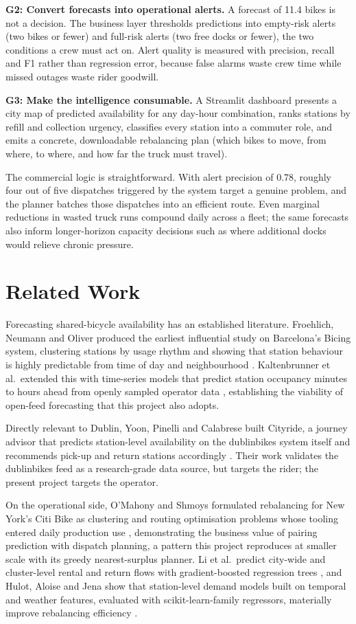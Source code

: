 \documentclass[conference]{IEEEtran}
\begin{document}
\textbf{G2: Convert forecasts into operational alerts.} A forecast of 11.4 bikes is not a decision. The business layer thresholds predictions into empty-risk alerts (two bikes or fewer) and full-risk alerts (two free docks or fewer), the two conditions a crew must act on. Alert quality is measured with precision, recall and F1 rather than regression error, because false alarms waste crew time while missed outages waste rider goodwill.

\textbf{G3: Make the intelligence consumable.} A Streamlit dashboard presents a city map of predicted availability for any day-hour combination, ranks stations by refill and collection urgency, classifies every station into a commuter role, and emits a concrete, downloadable rebalancing plan (which bikes to move, from where, to where, and how far the truck must travel).

The commercial logic is straightforward. With alert precision of 0.78, roughly four out of five dispatches triggered by the system target a genuine problem, and the planner batches those dispatches into an efficient route. Even marginal reductions in wasted truck runs compound daily across a fleet; the same forecasts also inform longer-horizon capacity decisions such as where additional docks would relieve chronic pressure.

\section{Related Work}
Forecasting shared-bicycle availability has an established literature. Froehlich, Neumann and Oliver produced the earliest influential study on Barcelona's Bicing system, clustering stations by usage rhythm and showing that station behaviour is highly predictable from time of day and neighbourhood \cite{b1}. Kaltenbrunner et al.\ extended this with time-series models that predict station occupancy minutes to hours ahead from openly sampled operator data \cite{b2}, establishing the viability of open-feed forecasting that this project also adopts.

Directly relevant to Dublin, Yoon, Pinelli and Calabrese built Cityride, a journey advisor that predicts station-level availability on the dublinbikes system itself and recommends pick-up and return stations accordingly \cite{b3}. Their work validates the dublinbikes feed as a research-grade data source, but targets the rider; the present project targets the operator.

On the operational side, O'Mahony and Shmoys formulated rebalancing for New York's Citi Bike as clustering and routing optimisation problems whose tooling entered daily production use \cite{b4}, demonstrating the business value of pairing prediction with dispatch planning, a pattern this project reproduces at smaller scale with its greedy nearest-surplus planner. Li et al.\ predict city-wide and cluster-level rental and return flows with gradient-boosted regression trees \cite{b5}, and Hulot, Aloise and Jena show that station-level demand models built on temporal and weather features, evaluated with scikit-learn-family regressors, materially improve rebalancing efficiency \cite{b6}.
\end{document}
